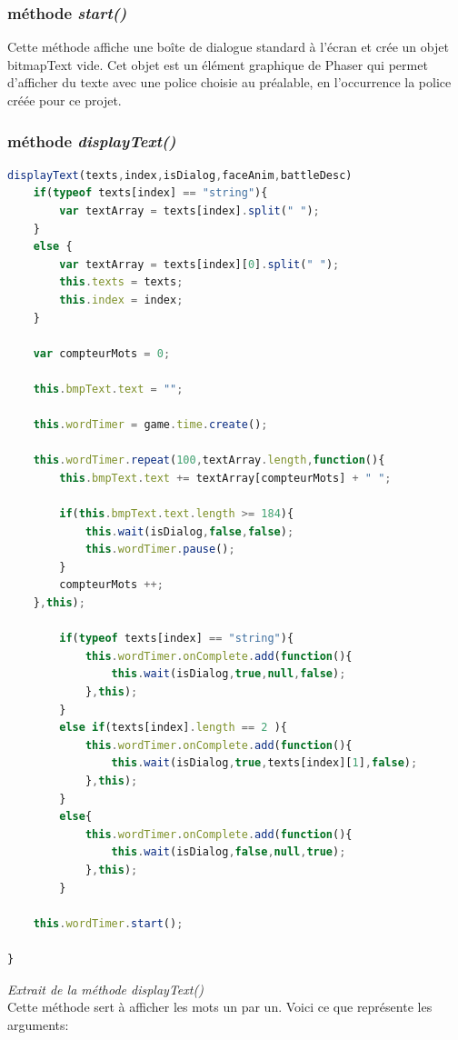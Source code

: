 \documentclass[11pt]{article}
\begin{document}
\subsubsection{méthode \textit{start()}}
Cette méthode affiche une boîte de dialogue standard à l'écran et crée un objet bitmapText vide. Cet objet est un élément graphique de Phaser qui permet d'afficher du texte avec une police choisie au préalable, en l'occurrence la police créée pour ce projet.
\subsubsection{méthode \textit{displayText()}}
\begin{lstlisting}[language=JavaScript]
displayText(texts,index,isDialog,faceAnim,battleDesc)
    if(typeof texts[index] == "string"){
        var textArray = texts[index].split(" "); 
    }
    else {
        var textArray = texts[index][0].split(" ");
        this.texts = texts;
        this.index = index;
    }

    var compteurMots = 0;

    this.bmpText.text = "";

    this.wordTimer = game.time.create();

    this.wordTimer.repeat(100,textArray.length,function(){
        this.bmpText.text += textArray[compteurMots] + " ";

        if(this.bmpText.text.length >= 184){
            this.wait(isDialog,false,false);
            this.wordTimer.pause();
        }
        compteurMots ++;
    },this);
  
        if(typeof texts[index] == "string"){
            this.wordTimer.onComplete.add(function(){
                this.wait(isDialog,true,null,false);
            },this); 
        }
        else if(texts[index].length == 2 ){
            this.wordTimer.onComplete.add(function(){
                this.wait(isDialog,true,texts[index][1],false);
            },this);
        }
        else{
            this.wordTimer.onComplete.add(function(){
                this.wait(isDialog,false,null,true);
            },this);
        }
    
    this.wordTimer.start();

}
\end{lstlisting} 
\textit{Extrait de la méthode displayText()}\\
Cette méthode sert à afficher les mots un par un. Voici ce que représente les arguments:\\
\end{document}

